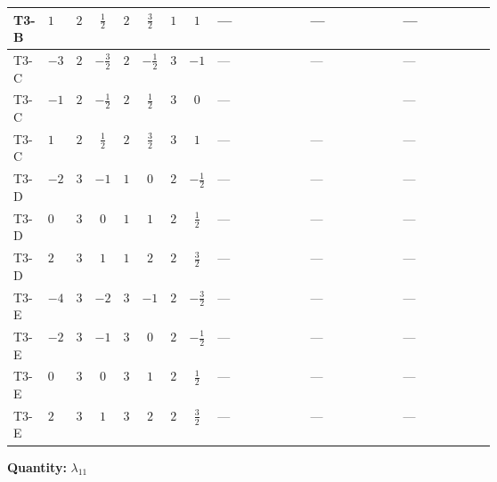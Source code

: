 \documentclass[8pt]{article}
\begin{document}
\begin{landscape}
\begin{longtable}{@{}llcccccc >{\raggedright\arraybackslash}p{0.21\linewidth} >{\raggedright\arraybackslash}p{0.21\linewidth} >{\raggedright\arraybackslash}p{0.21\linewidth}@{}}
\midrule
T3-B & $1$ & $2$ & $\frac{1}{2}$ & $2$ & $\frac{3}{2}$ & $1$ & $1$ & --- & --- & --- \\
\midrule
T3-C & $-3$ & $2$ & $-\frac{3}{2}$ & $2$ & $-\frac{1}{2}$ & $3$ & $-1$ & --- & --- & --- \\
\midrule
T3-C & $-1$ & $2$ & $-\frac{1}{2}$ & $2$ & $\frac{1}{2}$ & $3$ & $0$ & --- & \scriptsize\adjustbox{max width=\linewidth}{$\begin{gathered} +{\lambda_{12}^{(A)}} \left(\frac{1}{8} \operatorname{Tr}\!\left({y_2}\,\left({y_1}\right)^{\dagger}\right)+\frac{{\lambda_{10}}}{6}+\frac{5 {\lambda_{11}}}{6}\right)\end{gathered}$} & --- \\
\midrule
T3-C & $1$ & $2$ & $\frac{1}{2}$ & $2$ & $\frac{3}{2}$ & $3$ & $1$ & --- & --- & --- \\
\midrule
T3-D & $-2$ & $3$ & $-1$ & $1$ & $0$ & $2$ & $-\frac{1}{2}$ & --- & --- & --- \\
\midrule
T3-D & $0$ & $3$ & $0$ & $1$ & $1$ & $2$ & $\frac{1}{2}$ & --- & --- & --- \\
\midrule
T3-D & $2$ & $3$ & $1$ & $1$ & $2$ & $2$ & $\frac{3}{2}$ & --- & --- & --- \\
\midrule
T3-E & $-4$ & $3$ & $-2$ & $3$ & $-1$ & $2$ & $-\frac{3}{2}$ & --- & --- & --- \\
\midrule
T3-E & $-2$ & $3$ & $-1$ & $3$ & $0$ & $2$ & $-\frac{1}{2}$ & --- & --- & --- \\
\midrule
T3-E & $0$ & $3$ & $0$ & $3$ & $1$ & $2$ & $\frac{1}{2}$ & --- & --- & --- \\
\midrule
T3-E & $2$ & $3$ & $1$ & $3$ & $2$ & $2$ & $\frac{3}{2}$ & --- & --- & --- \\
\midrule
\bottomrule
\end{longtable}
\clearpage
\noindent\textbf{Quantity: }$\lambda_{11}$\par\smallskip

\end{landscape}
\end{document}
